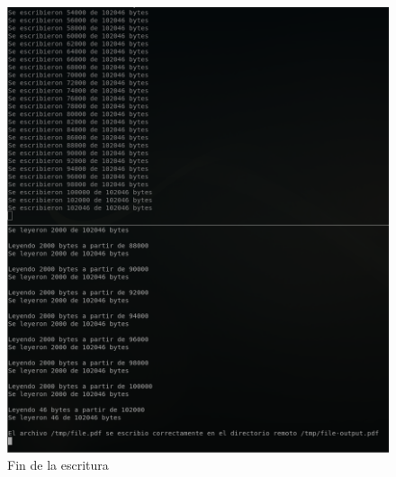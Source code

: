 \documentclass[12pt,journal,compsoc]{IEEEtran}
\begin{document}
\begin{figure}[H]
  \centering
  \includegraphics[width=160mm]{images/punto-3/write/3-end-write.png}
  \caption{Fin de la escritura}
  \label{fig:end-write}
\end{figure}
\end{document}

